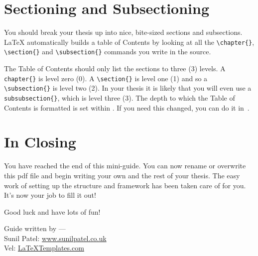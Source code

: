 
\section{Sectioning and Subsectioning}

You should break your thesis up into nice, bite-sized sections and subsections. \LaTeX{} automatically builds a table of Contents by looking at all the \verb|\chapter{}|, \verb|\section{}|  and \verb|\subsection{}| commands you write in the source.

The Table of Contents should only list the sections to three (3) levels. A \verb|chapter{}| is level zero (0). A \verb|\section{}| is level one (1) and so a \verb|\subsection{}| is level two (2). In your thesis it is likely that you will even use a \verb|subsubsection{}|, which is level three (3). The depth to which the Table of Contents is formatted is set within . If you need this changed, you can do it in~.


\section{In Closing}

You have reached the end of this mini-guide. You can now rename or overwrite this pdf file and begin writing your own  and the rest of your thesis. The easy work of setting up the structure and framework has been taken care of for you. It's now your job to fill it out!

Good luck and have lots of fun!

\begin{flushright}
	Guide written by ---\\
	Sunil Patel: \href{http://www.sunilpatel.co.uk}{www.sunilpatel.co.uk}\\
	Vel: \href{http://www.LaTeXTemplates.com}{LaTeXTemplates.com}
\end{flushright}

